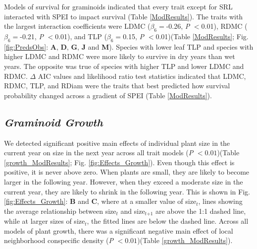 \documentclass[12pt, letterpaper]{article}
\begin{document}
Models of survival for graminoids indicated that every trait except for SRL interacted with SPEI to impact survival (Table \ref{ModResults}). The traits with the largest interaction coefficients were LDMC ($\beta _6=$-0.26, \textit{P} $<$0.01), RDMC ($\beta _6=$-0.21, \textit{P} $<$0.01), and TLP ($\beta _6=$0.15, \textit{P} $<$0.01)(Table \ref{ModResults}; Fig. \ref{fig:PredsObs}: \textbf{A}, \textbf{D}, \textbf{G}, \textbf{J} and \textbf{M}). Species with lower leaf TLP and species with higher LDMC and RDMC were more likely to survive in dry years than wet years. The opposite was true of species with higher TLP and lower LDMC and RDMC. $\Delta$ AIC values and likelihood ratio test statistics indicated that LDMC, RDMC, TLP, and RDiam were the traits that best predicted how survival probability changed across a gradient of SPEI (Table \ref{ModResults}).

\subsection{\textit{Graminoid Growth}} 
We detected significant positive main effects of individual plant size in the current year on size in the next year across all trait models (\textit{P} $<0.01$)(Table \ref{growth_ModResults}; Fig. \ref{fig:Effects_Growth}). Even though this effect is positive, it is never above zero. When plants are small, they are likely to become larger in the following year. However, when they exceed a moderate size in the current year, they are likely to shrink in the following year. This is shown in Fig. \ref{fig:Effects_Growth}: \textbf{B} and \textbf{C}, where at a smaller value of size$_{\textit{t}}$, lines showing the average relationship between size$_{\textit{t}}$ and size$_{\textit{t+1}}$ are above the 1:1 dashed line, while at larger sizes of size$_{\textit{t}}$, the fitted lines are below the dashed line. Across all models of plant growth, there was a significant negative main effect of local neighborhood conspecific density (\textit{P} $<0.01$)(Table \ref{growth_ModResults}).
\end{document}
